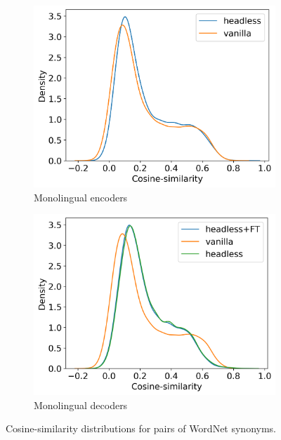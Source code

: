 \begin{figure}[H]
    \centering
    \begin{subfigure}[b]{0.48\columnwidth}
         \includegraphics[width=\linewidth]{sources/part_2/headless/imgs/input_embs_cosines_bert.png}
         \caption{Monolingual encoders}
         \label{fig:input_embs_cosines_bert}
    \end{subfigure}
    \begin{subfigure}[b]{0.48\columnwidth}
         \includegraphics[width=\linewidth]{sources/part_2/headless/imgs/input_embs_cosines_pythia.png}
         \caption{Monolingual decoders}
         \label{fig:input_embs_cosines_pythia}
    \end{subfigure}
    \caption{Cosine-similarity distributions for pairs of WordNet synonyms.}
    \label{fig:cosine_input_embs}
\end{figure}

